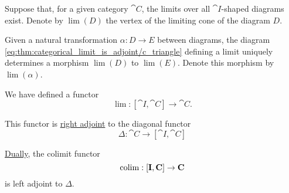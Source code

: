 \begin{proposition}\label{thm:categorical_limit_is_adjoint}
  Suppose that, for a given category \( \cat{C} \), the limits over all \( \cat{I} \)-shaped diagrams exist. Denote by \( \lim(D) \) the vertex of the limiting cone of the diagram \( D \).

  Given a natural transformation \( \alpha: D \to E \) between diagrams, the diagram \eqref{eq:thm:categorical_limit_is_adjoint/c_triangle} defining a limit uniquely determines a morphism \( \lim(D) \) to \( \lim(E) \). Denote this morphism by \( \lim(\alpha) \).

  We have defined a functor
  \begin{equation*}
    \lim: [\cat{I}, \cat{C}] \to \cat{C}.
  \end{equation*}

  This functor is \hyperref[def:category_adjunction]{right adjoint} to the diagonal functor
  \begin{equation*}
    \Delta: \cat{C} \to [\cat{I}, \cat{C}]
  \end{equation*}

  \hyperref[thm:categorical_principle_of_duality]{Dually}, the colimit functor
  \begin{equation*}
    \co\lim: [\cat{I}, \cat{C}] \to \cat{C}
  \end{equation*}
  is left adjoint to \( \Delta \).
\end{proposition}
